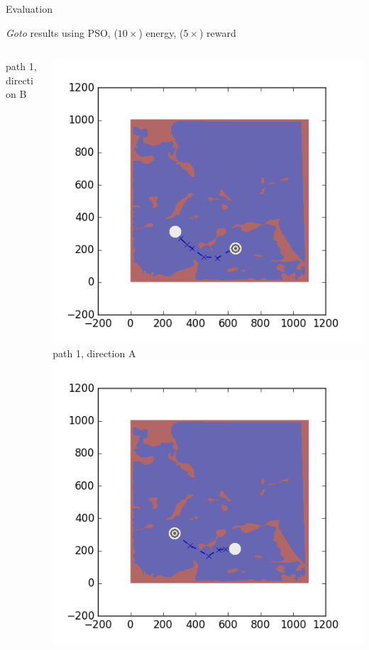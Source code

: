 \documentclass[9pt]{beamer}
\begin{document}
\begin{frame}{Evaluation}
\begin{block}{\textit{Goto} results using PSO, ($10\times$) energy, ($5\times$) reward}
\begin{columns}
\begin{column}{0.33\textwidth}
\begin{center}
                    \newline
                    \tiny{path 1, direction B}
                \end{center}
            \end{column}
            \begin{column}{0.33\textwidth}
                \begin{center}
                    \includegraphics[width=\textwidth,trim={2cm 2cm 2cm 2cm},clip]{img/EXP3RG_PathCa_-1_-1_0d01_0d005.png}
                    \newline
                    \tiny{path 1, direction A}
                    \newline
                    \includegraphics[width=\textwidth,trim={2cm 2cm 2cm 2cm},clip]{img/EXP3RG_PathCb_-1_-1_0d01_0d005.png}

\end{center}
\end{column}
\end{columns}
\end{block}
\end{frame}
\end{document}
